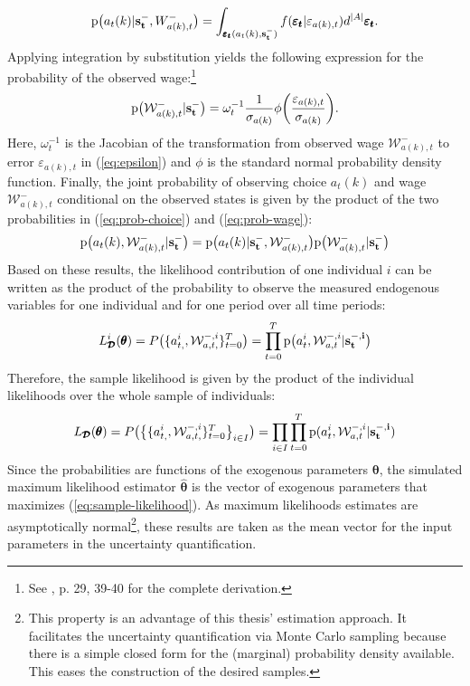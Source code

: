 \documentclass[a4paper,12pt]{article}
\begin{document}
\noindent
\begin{align} \label{eq:prob-choice}
\text{p}\big(a_t(k) | \bold{s_t^-},W^{-}_{a(k),t}\big) = \int_{\pmb{\varepsilon_t}(a_t(k),\bold{s_t^-})} f(\pmb{\varepsilon_t}|\varepsilon_{a(k),t}) d^{|A|} \pmb{\varepsilon_t}.
\end{align}
Applying integration by substitution yields the following expression for the probability of the observed wage:\footnote{See \cite{Raabe.2019}, p. 29, 39-40 for the complete derivation.}
\begin{align} \label{eq:prob-wage}
\text{p}\big(\mathcal{W}^{-}_{a(k),t} | \bold{s_t^-}\big) = \omega_t^{-1} \frac{1}{\sigma_{a(k)}} \phi\bigg(\frac{\varepsilon_{a(k),t}}{\sigma_{a(k)}}\bigg).
\end{align}
Here, $\omega_t^{-1}$ is the Jacobian of the transformation from observed wage $\mathcal{W}^{-}_{a(k),t}$ to error $\varepsilon_{a(k),t}$ in (\ref{eq:epsilon}) and $\phi$ is the standard normal probability density function.
Finally, the joint probability of observing choice $a_t(k)$ and wage $\mathcal{W}^{-}_{a(k),t}$ conditional on the observed states is given by the product of the two probabilities in (\ref{eq:prob-choice}) and (\ref{eq:prob-wage}):
\begin{align}
\text{p}\big(a_t(k),\mathcal{W}^{-}_{a(k),t}|\bold{s_t^-}\big) = \text{p}\big(a_t(k)|\bold{s_t^-}, \mathcal{W}^{-}_{a(k),t}\big)\text{p}\big(\mathcal{W}^{-}_{a(k),t}|\bold{s_t^-}\big)
\end{align}
Based on these results, the likelihood contribution of one individual $i$ can be written as the product of the probability to observe the measured endogenous variables for one individual and for one period over all time periods:
\begin{align}
L^{i}_{\pmb{\mathcal{D}}}(\pmb{\theta}) = P\big(\{a_{t,}^{i},\mathcal{W}^{-,i}_{a,t,}\}_{t=0}^T\big) = \prod_{t=0}^{T} \text{p}\big(a_t^{i},\mathcal{W}_{a,t}^{-,i}|\bold{s_t^{-,i}}\big)
\end{align}
Therefore, the sample likelihood is given by the product of the individual likelihoods over the whole sample of individuals:
\begin{align} \label{eq:sample-likelihood}
L_{\pmb{\mathcal{D}}}(\pmb{\theta}) = P\big(\big\{\{a_{t,}^{i},\mathcal{W}^{-,i}_{a,t,}\}_{t=0}^T\big\}_{i \in I}\big) = \prod_{i \in I}\prod_{t=0}^{T} \text{p}(a_t^{i},\mathcal{W}_{a,t}^{-,i}|\bold{s_t^{-,i})}
\end{align}
Since the probabilities are functions of the exogenous parameters $\pmb{\theta}$, the simulated maximum likelihood estimator $\pmb{\hat{\theta}}$ is the vector of exogenous parameters that maximizes (\ref{eq:sample-likelihood}). As maximum likelihoods estimates are asymptotically normal\footnote{This property is an advantage of this thesis' estimation approach. It facilitates the uncertainty quantification via Monte Carlo sampling because there is a simple closed form for the (marginal) probability density available. This eases the construction of the desired samples.}, these results are taken as the mean vector for the input parameters in the uncertainty quantification.
\end{document}
